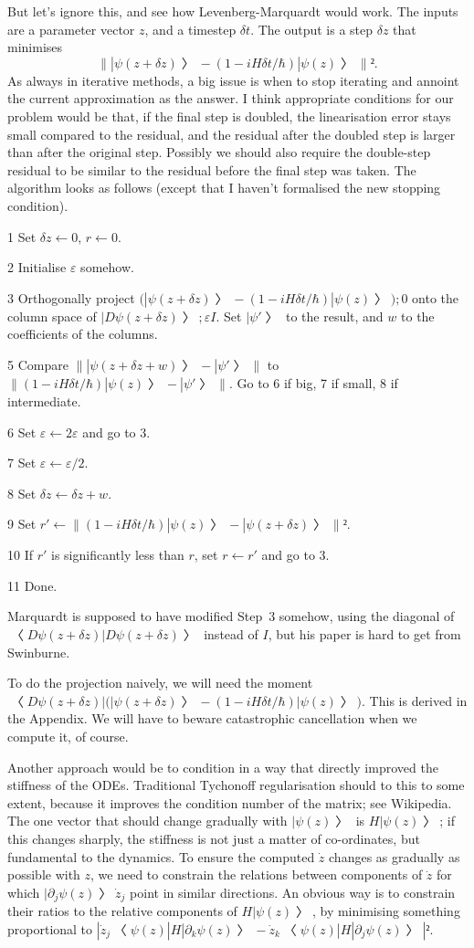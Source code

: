 But let's ignore this, and see how Levenberg-Marquardt would work.  The inputs are a parameter vector $z$, and a timestep $δt$.  The output is a step $δz$ that minimises $$\bigl\| |ψ(z+δz)〉-(1-iHδt/\hbar)|ψ(z)〉\bigr\|².$$  As always in iterative methods, a big issue is when to stop iterating and annoint the current approximation as the answer.  I think appropriate conditions for our problem would be that, if the final step is doubled, the linearisation error stays small compared to the residual, and the residual after the doubled step is larger than after the original step.  Possibly we should also require the double-step residual to be similar to the residual before the final step was taken.  The algorithm looks as follows (except that I haven't formalised the new stopping condition).

\item{1} Set $δz←0$, $r←0$.
\item{2} Initialise $ε$ somehow.
\item{3} Orthogonally project $\bigl(|ψ(z+δz)〉-(1-iHδt/\hbar)|ψ(z)〉\bigr); 0$ onto the column space of $|Dψ(z+δz)〉; εI$. Set $|ψ'〉$ to the result, and $w$ to the coefficients of the columns.
\item{5} Compare $\bigl\| |ψ(z+δz+w)〉-|ψ'〉\bigr\|$ to $\bigl\| (1-iHδt/\hbar)|ψ(z)〉-|ψ'〉\bigr\|$.  Go to 6 if big, 7 if small, 8 if intermediate.
\item{6} Set $ε←2ε$ and go to 3.
\item {7} Set $ε←ε/2$.
\item{8} Set $δz←δz+w$.
\item{9} Set $r'←\bigl\| (1-iHδt/\hbar)|ψ(z)〉-|ψ(z+δz)〉\bigr\|²$.
\item{10} If $r'$ is significantly less than $r$, set $r←r'$ and go to 3.
\item{11} Done.

Marquardt is supposed to have modified Step~3 somehow, using the diagonal of $〈Dψ(z+δz)|Dψ(z+δz)〉$ instead of $I$, but his paper is hard to get from Swinburne.

To do the projection naively, we will need the moment $〈Dψ(z+δz)|\bigl(|ψ(z+δz)〉-(1-iHδt/\hbar)|ψ(z)〉\bigr)$.  This is derived in the Appendix.  We will have to beware catastrophic cancellation when we compute it, of course.


Another approach would be to condition in a way that directly improved the stiffness of the ODEs.  Traditional Tychonoff regularisation should to this to some extent, because it improves the condition number of the matrix; see Wikipedia.  The one vector that should change gradually with $|ψ(z)〉$ is $H|ψ(z)〉$; if this changes sharply, the stiffness is not just a matter of co-ordinates, but fundamental to the dynamics.  To ensure the computed $\dot z$ changes as gradually as possible with $z$, we need to constrain the relations between components of $\dot z$ for which $|∂_jψ(z)〉{\dot z}_j$ point in similar directions.  An obvious way is to constrain their ratios to the relative components of $H|ψ(z)〉$, by minimising something proportional to $|{\dot z}_j〈ψ(z)|H|∂_kψ(z)〉-{\dot z}_k〈ψ(z)|H|∂_jψ(z)〉|²$. 

